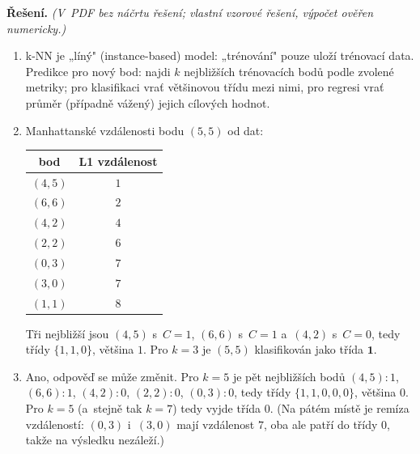 \medskip
\noindent\textbf{Řešení.} \textit{(V~PDF bez náčrtu řešení; vlastní vzorové řešení, výpočet ověřen numericky.)}\par
\begin{enumerate}[nosep]
  \item k-NN je „líný" (instance-based) model: „trénování" pouze uloží trénovací data. Predikce pro nový bod: najdi $k$ nejbližších trénovacích bodů podle zvolené metriky; pro klasifikaci vrať většinovou třídu mezi nimi, pro regresi vrať průměr (případně vážený) jejich cílových hodnot.
  \item Manhattanské vzdálenosti bodu $(5,5)$ od dat:
    \begin{center}
    \begin{tabular}{cc}
    \toprule
    bod & L1 vzdálenost \\
    \midrule
    $(4,5)$ & $1$ \\
    $(6,6)$ & $2$ \\
    $(4,2)$ & $4$ \\
    $(2,2)$ & $6$ \\
    $(0,3)$ & $7$ \\
    $(3,0)$ & $7$ \\
    $(1,1)$ & $8$ \\
    \bottomrule
    \end{tabular}
    \end{center}
    Tři nejbližší jsou $(4,5)$ s~$C{=}1$, $(6,6)$ s~$C{=}1$ a~$(4,2)$ s~$C{=}0$, tedy třídy $\{1,1,0\}$, většina $1$. Pro $k=3$ je $(5,5)$ klasifikován jako třída $\boldsymbol{1}$.
  \item Ano, odpověď se může změnit. Pro $k=5$ je pět nejbližších bodů $(4,5){:}1$, $(6,6){:}1$, $(4,2){:}0$, $(2,2){:}0$, $(0,3){:}0$, tedy třídy $\{1,1,0,0,0\}$, většina $0$. Pro $k=5$ (a~stejně tak $k=7$) tedy vyjde třída $0$. (Na pátém místě je remíza vzdáleností: $(0,3)$ i~$(3,0)$ mají vzdálenost $7$, oba ale patří do třídy $0$, takže na výsledku nezáleží.)
\end{enumerate}

